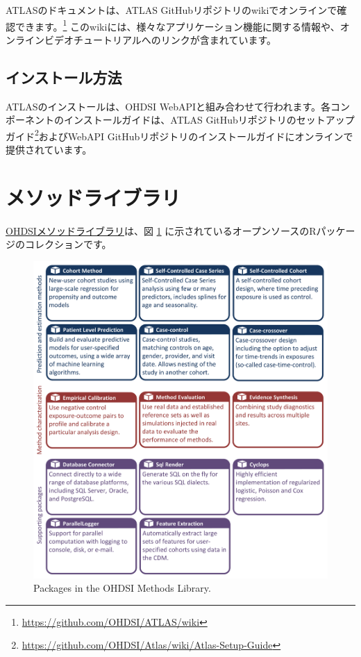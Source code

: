 \documentclass[
  11pt]{book}
\theoremstyle{definition}
\theoremstyle{definition}
\theoremstyle{definition}
\theoremstyle{definition}
\theoremstyle{remark}
\begin{document}
ATLASのドキュメントは、ATLAS GitHubリポジトリのwikiでオンラインで確認できます。\footnote{\url{https://github.com/OHDSI/ATLAS/wiki}} このwikiには、様々なアプリケーション機能に関する情報や、オンラインビデオチュートリアルへのリンクが含まれています。 

\subsection{インストール方法}\label{ux30a4ux30f3ux30b9ux30c8ux30fcux30ebux65b9ux6cd5}

ATLASのインストールは、OHDSI WebAPIと組み合わせて行われます。各コンポーネントのインストールガイドは、ATLAS GitHubリポジトリのセットアップガイド\footnote{\url{https://github.com/OHDSI/Atlas/wiki/Atlas-Setup-Guide}}およびWebAPI GitHubリポジトリのインストールガイドにオンラインで提供されています。 

\section{メソッドライブラリ}\label{ux30e1ux30bdux30c3ux30c9ux30e9ux30a4ux30d6ux30e9ux30ea}

\href{https://ohdsi.github.io/MethodsLibrary/}{OHDSIメソッドライブラリ}は、図 \ref{fig:methodsLibrary} に示されているオープンソースのRパッケージのコレクションです。 

\begin{figure}

{\centering \includegraphics[width=1\linewidth]{images/OhdsiAnalyticsTools/methodsLibrary} 

}

\caption{Packages in the OHDSI Methods Library.}\label{fig:methodsLibrary}
\end{figure}
\end{document}
